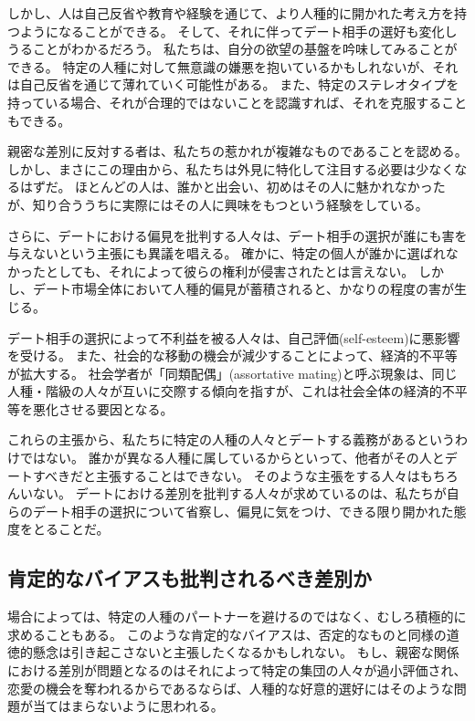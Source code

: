\documentclass[paper=a4,book,openany]{jlreq} \usepackage{mystyle}
\begin{document}
しかし、人は自己反省や教育や経験を通じて、より人種的に開かれた考え方を持つようになることができる。
そして、それに伴ってデート相手の選好も変化しうることがわかるだろう。
私たちは、自分の欲望の基盤を吟味してみることができる。
特定の人種に対して無意識の嫌悪を抱いているかもしれないが、それは自己反省を通じて薄れていく可能性がある。
また、特定のステレオタイプを持っている場合、それが合理的ではないことを認識すれば、それを克服することもできる。

親密な差別に反対する者は、私たちの惹かれが複雑なものであることを認める。
しかし、まさにこの理由から、私たちは外見に特化して注目する必要は少なくなるはずだ。
ほとんどの人は、誰かと出会い、初めはその人に魅かれなかったが、知り合ううちに実際にはその人に興味をもつという経験をしている。

さらに、デートにおける偏見を批判する人々は、デート相手の選択が誰にも害を与えないという主張にも異議を唱える。
確かに、特定の個人が誰かに選ばれなかったとしても、それによって彼らの権利が侵害されたとは言えない。
しかし、デート市場全体において人種的偏見が蓄積されると、かなりの程度の害が生じる\citep{lopez19:_sexual_racis_is}。

デート相手の選択によって不利益を被る人々は、自己評価(self-esteem)に悪影響を受ける。
また、社会的な移動の機会が減少することによって、経済的不平等が拡大する。
社会学者が「同類配偶」(assortative mating)と呼ぶ現象は、同じ人種・階級の人々が互いに交際する傾向を指すが、これは社会全体の経済的不平等を悪化させる要因となる\citep{milanovic19:_rich_like_me}。

これらの主張から、私たちに特定の人種の人々とデートする義務があるというわけではない。
誰かが異なる人種に属しているからといって、他者がその人とデートすべきだと主張することはできない。
そのような主張をする人々はもちろんいない。
デートにおける差別を批判する人々が求めているのは、私たちが自らのデート相手の選択について省察し、偏見に気をつけ、できる限り開かれた態度をとることだ。

\subsection{肯定的なバイアスも批判されるべき差別か}

場合によっては、特定の人種のパートナーを避けるのではなく、むしろ積極的に求めることもある。
このような肯定的なバイアスは、否定的なものと同様の道徳的懸念は引き起こさないと主張したくなるかもしれない。
もし、親密な関係における差別が問題となるのはそれによって特定の集団の人々が過小評価され、恋愛の機会を奪われるからであるならば、人種的な好意的選好にはそのような問題が当てはまらないように思われる。
\end{document}
